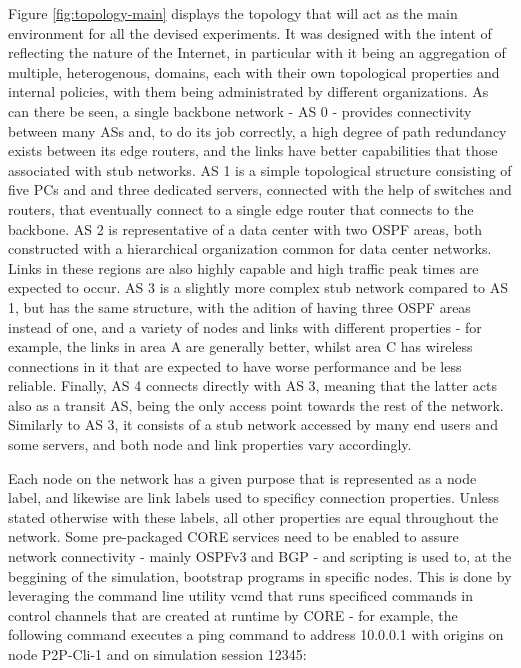     Figure \ref{fig:topology-main} displays the topology that will act as the main environment for all the devised experiments.
    It was designed with the intent of reflecting the nature of the Internet, in particular with it being an aggregation of multiple, heterogenous, domains, each with their own topological properties and internal policies, with them being administrated by different organizations.
    As can there be seen, a single backbone network - AS 0 - provides connectivity between many ASs and, to do its job correctly, a high degree of path redundancy exists between its edge routers, and the links have better capabilities that those associated with stub networks.
    AS 1 is a simple topological structure consisting of five PCs and and three dedicated servers, connected with the help of switches and routers, that eventually connect to a single edge router that connects to the backbone.
    AS 2 is representative of a data center with two OSPF areas, both constructed with a hierarchical organization common for data center networks.
    Links in these regions are also highly capable and high traffic peak times are expected to occur.
    AS 3 is a slightly more complex stub network compared to AS 1, but has the same structure, with the adition of having three OSPF areas instead of one, and a variety of nodes and links with different properties - for example, the links in area A are generally better, whilst area C has wireless connections in it that are expected to have worse performance and be less reliable.
    Finally, AS 4 connects directly with AS 3, meaning that the latter acts also as a transit AS, being the only access point towards the rest of the network.
    Similarly to AS 3, it consists of a stub network accessed by many end users and some servers, and both node and link properties vary accordingly.

    Each node on the network has a given purpose that is represented as a node label, and likewise are link labels used to specificy connection properties.
    Unless stated otherwise with these labels, all other properties are equal throughout the network.
    Some pre-packaged CORE services need to be enabled to assure network connectivity - mainly OSPFv3 and BGP - and scripting is used to, at the beggining of the simulation, bootstrap programs in specific nodes. 
    This is done by leveraging the command line utility vcmd that runs specificed commands in control channels that are created at runtime by CORE - for example, the following command executes a ping command to address 10.0.0.1 with origins on node P2P-Cli-1 and on simulation session 12345:

